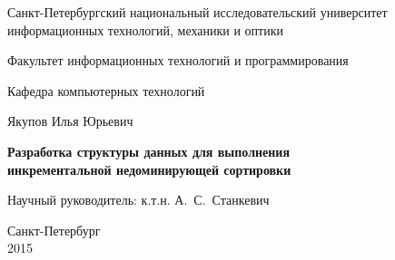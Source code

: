 \documentclass[a4paper]{report}
\theoremstyle{plain}
\theoremstyle{definition}
\numberwithin{theorem}{chapter}        %
\begin{document}
\initializefrontsections

\pagestyle{title}

\begin{center}
Санкт-Петербургский национальный исследовательский университет \\ информационных технологий, механики и оптики

\vspace{2cm}

Факультет информационных технологий и программирования

Кафедра компьютерных технологий

\vspace{3cm}

{\Large Якупов Илья Юрьевич}

\vspace{2cm}

\vbox{\LARGE\bfseries
Разработка структуры данных для выполнения \\
инкрементальной недоминирующей сортировки
}

\vspace{4cm}

{\Large Научный руководитель: к.т.н. А.~С.~Станкевич}

\vspace{6cm}

Санкт-Петербург\\ 2015
\end{center}

\newpage

\setcounter{page}{3}
\pagestyle{plain}

\tableofcontents

\startthechapters





%


\printbibliography
\end{document}
